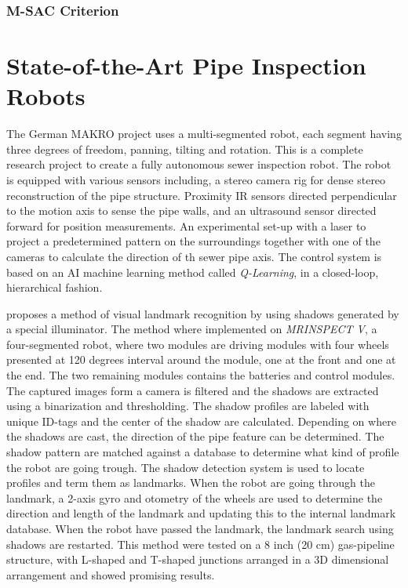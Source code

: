 \subsubsection{M-SAC Criterion}



\section{State-of-the-Art Pipe Inspection Robots}
The German MAKRO project \cite{MAKRO-project} uses a multi-segmented robot, each segment 
having three degrees of freedom, panning, tilting and rotation. This is a complete
research project to create a fully autonomous sewer inspection robot. The robot is
equipped with various sensors including, a stereo camera rig for dense stereo
reconstruction of the pipe structure. Proximity IR sensors directed perpendicular to the
motion axis to sense the pipe walls, and an ultrasound sensor directed forward for
position measurements. An experimental set-up with a laser to project a predetermined
pattern on the surroundings together with one of the cameras to calculate the direction of
th sewer pipe axis. The control system is based on an AI machine learning method called \emph{Q-Learning}, in
a closed-loop, hierarchical fashion.


\cite{MRINSPECT-V} proposes a method of visual landmark recognition by using shadows
generated by a special illuminator. The method where implemented on \emph{MRINSPECT V}, a
four-segmented robot, where two modules are driving modules with four wheels presented at
120 degrees interval around the module, one at the front and one at the end. The two
remaining modules contains the batteries and control modules. 
The captured images form a camera is filtered and the
shadows are extracted using a binarization and thresholding. The shadow profiles are
labeled with unique ID-tags and the center of the shadow are calculated. Depending on
where the shadows are cast, the direction of the pipe feature can be determined. The
shadow pattern are matched against a database to determine what kind of profile the robot
are going trough. The shadow detection system is used to locate profiles and term them as
landmarks. When the robot are going through the landmark, a 2-axis gyro and otometry of
the wheels are used to determine the direction and length of the landmark and updating
this to the internal landmark database. When the robot have passed the landmark, the 
landmark search using shadows are restarted. This method were tested on a 8 inch (20 cm)
gas-pipeline structure, with L-shaped and T-shaped junctions arranged in a 3D dimensional
arrangement and showed promising results. 



